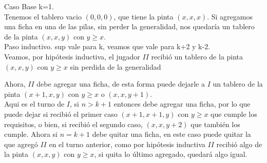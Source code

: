 \documentclass[a4paper]{article}
\begin{document}
Caso Base k=1.\\

Tenemos el tablero vacio $(0,0,0)$, que tiene la pinta $(x,x,x)$. Si agregamos una ficha en una de las pilas, sin perder la generalidad, nos quedaría un tablero de la pinta $(x,x,y)$ con $y \geq x$.\\

Paso inductivo. sup vale para k, veamos que vale para k+2 y k-2.\\

Veamos, por hipótesis inductiva, el jugador $II$ recibió un tablero de la pinta $(x,x,y)$ con $y \geq x$ sin perdida de la generalidad



Ahora, $II$ debe agregar una ficha, de esta forma puede dejarle a $I$ un tablero de la pinta $(x+1,x,y)$ con $y \geq x$ o $(x,x,y+1)$.\\
Aqui es el turno de $I$, si $n > k +1$ entonces debe agregar una ficha, por lo que puede dejar si recibió el primer caso $(x+1,x+1,y)$ con $y \geq x$ que cumple los requisitos, o bien, si recibió el segundo caso, $(x,x,y+2)$ que también los cumple.
Ahora si $n = k+1$ debe quitar una ficha, en este caso puede quitar la que agregó $II$ en el turno anterior, como por hipótesis inductiva $II$ recibió algo de la pinta $(x,x,y)$ con $y \geq x$, si quita lo último agregado, quedará algo igual.



\end{document}
